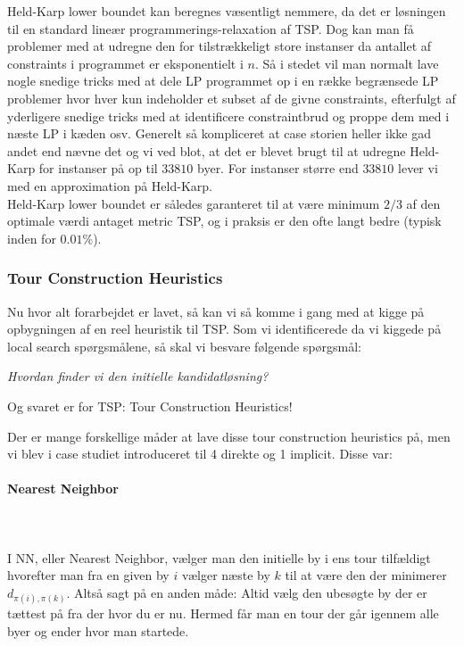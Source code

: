 Held-Karp lower boundet kan beregnes væsentligt nemmere, da det er løsningen til en standard lineær programmerings-relaxation af TSP. Dog kan man få problemer med at udregne den for tilstrækkeligt store instanser da antallet af constraints i programmet er eksponentielt i $n$. Så i stedet vil man normalt lave nogle snedige tricks med at dele LP programmet op i en række begrænsede LP problemer hvor hver kun indeholder et subset af de givne constraints, efterfulgt af yderligere snedige tricks med at identificere constraintbrud og proppe dem med i næste LP i kæden osv. Generelt så kompliceret at case storien heller ikke gad andet end nævne det og vi ved blot, at det er blevet brugt til at udregne Held-Karp for instanser på op til $33810$ byer. For instanser større end $33810$ lever vi med en approximation på Held-Karp.\\

Held-Karp lower boundet er således garanteret til at være minimum $2/3$ af den optimale værdi antaget metric TSP, og i praksis er den ofte langt bedre (typisk inden for $0.01\%$).

\subsubsection{Tour Construction Heuristics}

Nu hvor alt forarbejdet er lavet, så kan vi så komme i gang med at kigge på opbygningen af en reel heuristik til TSP. Som vi identificerede da vi kiggede på local search spørgsmålene, så skal vi besvare følgende spørgsmål:
\begin{center}
 \textit{Hvordan finder vi den initielle kandidatløsning?}
\end{center}
Og svaret er for TSP: Tour Construction Heuristics!

Der er mange forskellige måder at lave disse tour construction heuristics på, men vi blev i case studiet introduceret til 4 direkte og 1 implicit. Disse var:

\paragraph{Nearest Neighbor}
~\\
~\\
I NN, eller Nearest Neighbor, vælger man den initielle by i ens tour tilfældigt hvorefter man fra en given by $i$ vælger næste by $k$ til at være den der minimerer $d_{\pi(i),\pi(k)}$. Altså sagt på en anden måde: Altid vælg den ubesøgte by der er tættest på fra der hvor du er nu. Hermed får man en tour der går igennem alle byer og ender hvor man startede.

